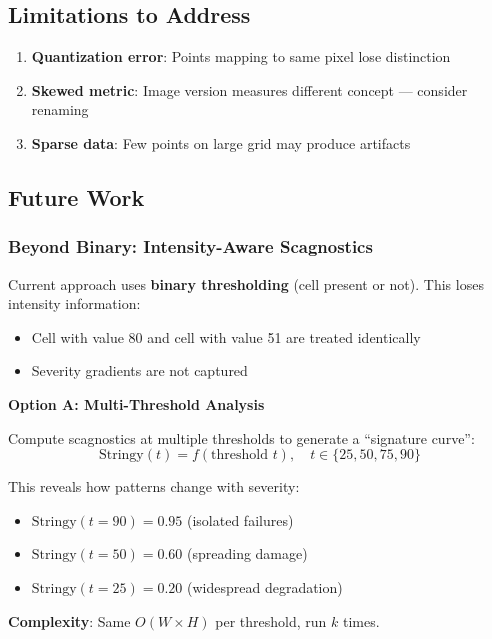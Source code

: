 \documentclass[11pt]{article}
\begin{document}
\subsection{Limitations to Address}
\begin{enumerate}
    \item \textbf{Quantization error}: Points mapping to same pixel lose distinction
    \item \textbf{Skewed metric}: Image version measures different concept — consider renaming
    \item \textbf{Sparse data}: Few points on large grid may produce artifacts
\end{enumerate}

\subsection{Future Work}

\subsubsection{Beyond Binary: Intensity-Aware Scagnostics}

Current approach uses \textbf{binary thresholding} (cell present or not). This loses intensity information:
\begin{itemize}
    \item Cell with value 80 and cell with value 51 are treated identically
    \item Severity gradients are not captured
\end{itemize}

\textbf{Option A: Multi-Threshold Analysis}

Compute scagnostics at multiple thresholds to generate a ``signature curve'':
\begin{equation}
    \text{Stringy}(t) = f(\text{threshold } t), \quad t \in \{25, 50, 75, 90\}
\end{equation}

This reveals how patterns change with severity:
\begin{itemize}
    \item $\text{Stringy}(t=90) = 0.95$ (isolated failures)
    \item $\text{Stringy}(t=50) = 0.60$ (spreading damage)
    \item $\text{Stringy}(t=25) = 0.20$ (widespread degradation)
\end{itemize}

\textbf{Complexity}: Same $O(W \times H)$ per threshold, run $k$ times.
\end{document}
